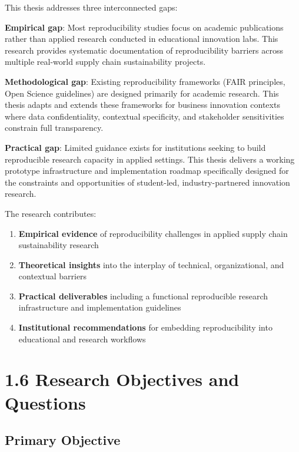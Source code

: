 \documentclass[
  oneside,
  open=any]{scrbook}
\providecommand{\tightlist}{%
  \setlength{\itemsep}{0pt}\setlength{\parskip}{0pt}}\usepackage{longtable,booktabs,array}
\begin{document}
This thesis addresses three interconnected gaps:

\textbf{Empirical gap}: Most reproducibility studies focus on academic
publications rather than applied research conducted in educational
innovation labs. This research provides systematic documentation of
reproducibility barriers across multiple real-world supply chain
sustainability projects.

\textbf{Methodological gap}: Existing reproducibility frameworks (FAIR
principles, Open Science guidelines) are designed primarily for academic
research. This thesis adapts and extends these frameworks for business
innovation contexts where data confidentiality, contextual specificity,
and stakeholder sensitivities constrain full transparency.

\textbf{Practical gap}: Limited guidance exists for institutions seeking
to build reproducible research capacity in applied settings. This thesis
delivers a working prototype infrastructure and implementation roadmap
specifically designed for the constraints and opportunities of
student-led, industry-partnered innovation research.

The research contributes:

\begin{enumerate}
\def\labelenumi{\arabic{enumi}.}
\tightlist
\item
  \textbf{Empirical evidence} of reproducibility challenges in applied
  supply chain sustainability research
\item
  \textbf{Theoretical insights} into the interplay of technical,
  organizational, and contextual barriers
\item
  \textbf{Practical deliverables} including a functional reproducible
  research infrastructure and implementation guidelines
\item
  \textbf{Institutional recommendations} for embedding reproducibility
  into educational and research workflows
\end{enumerate}

\section{1.6 Research Objectives and
Questions}\label{research-objectives-and-questions}

\subsection{Primary Objective}\label{primary-objective}
\end{document}
